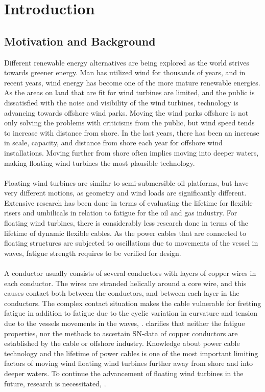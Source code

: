 \chapter{Introduction}
\label{chap:introduction}
\section{Motivation and Background}
Different renewable energy alternatives are being explored as the world strives towards greener energy.  Man has utilized wind for thousands of years, and in recent years, wind energy has become one of the more mature renewable energies. As the areas on land that are fit for wind turbines are limited, and the public is dissatisfied with the noise and visibility of the wind turbines, technology is advancing towards offshore wind parks. Moving the wind parks offshore is not only solving the problems with criticisms from the public, but wind speed tends to increase with distance from shore. In the last years, there has been an increase in scale, capacity, and distance from shore each year for offshore wind installations. Moving further from shore often implies moving into deeper waters, making floating wind turbines the most plausible technology.\\\\ Floating wind turbines are similar to semi-submersible oil platforms, but have very different motions, as geometry and wind loads are significantly different. Extensive research has been done in terms of evaluating the lifetime for flexible risers and umbilicals in relation to fatigue for the oil and gas industry. For floating wind turbines, there is considerably less research done in terms of the lifetime of dynamic flexible cables. As the power cables that are connected to floating structures are subjected to oscillations due to movements of the vessel in waves, fatigue strength requires to be verified for design.\\\\ A conductor usually consists of several conductors with layers of copper wires in each conductor. The wires are stranded helically around a core wire, and this causes contact both between the conductors, and between each layer in the conductors. The complex contact situation makes the cable vulnerable for fretting fatigue in addition to fatigue due to the cyclic variation in curvature and tension due to the vessels movements in the waves,  \cite{s300}. \cite{Karlsen2010} clarifies that neither the fatigue properties, nor the methods to ascertain SN-data of copper conductors are established by the cable or offshore industry.  Knowledge about power cable technology and the lifetime of power cables is one of the most important limiting factors of moving wind floating wind turbines further away from shore and into deeper waters. To continue the advancement of floating wind turbines in the future, research is necessitated, \cite{Thies2012}.

